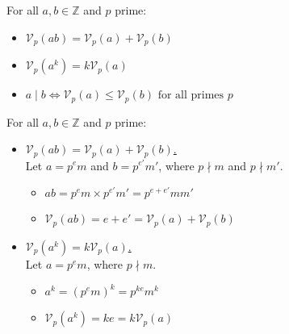 \newpage

\begin{theo}

    \label{theo:operations_of_V_p(n)}

    For all $a,b\in\mathbb{Z}$ and $p$ prime:
    \begin{itemize}
        \item $\mathcal{V}_p(ab) = \mathcal{V}_p(a) + \mathcal{V}_p(b)$
        \item $\mathcal{V}_p(a^k) = k \mathcal{V}_p(a)$
        \item $a \mid b \iff \mathcal{V}_p(a) \leq \mathcal{V}_p(b) \text{ for all primes } p$
    \end{itemize}
\end{theo}

\begin{Proof}
    For all $a,b\in\mathbb{Z}$ and $p$ prime:
    \begin{itemize}
        \item \underline{$\mathcal{V}_p(ab) = \mathcal{V}_p(a) + \mathcal{V}_p(b)$.}\\
        Let $a = p^e m$ and $b = p^{e'} m'$, where $p \nmid m$ and $p \nmid m'$. 

        \vspace{-.5em}
        \begin{itemize}
            \item $ab = p^e m \times p^{e'} m' = p^{e + e'} m m'$
            \item $\mathcal{V}_p(ab) = e + e' = \mathcal{V}_p(a) + \mathcal{V}_p(b)$
        \end{itemize}
        \vspace{.5em}

        \item \underline{$\mathcal{V}_p(a^k) = k \mathcal{V}_p(a)$.}\\
        Let $a = p^e m$, where $p \nmid m$.

        \vspace{-.5em}
        \begin{itemize}
            \item $a^k = (p^e m)^k = p^{ke} m^k$
            \item $\mathcal{V}_p(a^k) = ke = k \mathcal{V}_p(a)$
        \end{itemize}
        \vspace{.5em}


\end{itemize}
\end{Proof}
